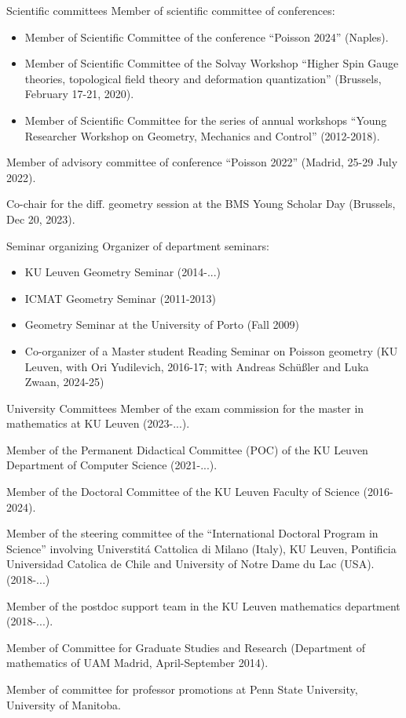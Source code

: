 \documentclass[12p]{resume}
\begin{document}
\begin{category}{Scientific committees}
\citemnobullet 
Member of scientific committee of conferences:
 \begin{itemize}
\item Member of Scientific Committee of the conference ``Poisson 2024'' (Naples).
\item  Member of Scientific Committee of the Solvay Workshop ``Higher Spin Gauge theories, topological field theory and deformation quantization'' (Brussels, February 17-21, 2020).
\item Member of Scientific Committee for the series of annual workshops ``Young Researcher Workshop on Geometry, Mechanics and Control'' (2012-2018).
 \end{itemize}
 Member of advisory committee of conference ``Poisson 2022'' (Madrid, 25-29 July 2022).
 
Co-chair for the diff. geometry session at the BMS Young Scholar Day (Brussels, Dec 20, 2023).
 \end{category}
 
\begin{category}{Seminar organizing}
\citemnobullet Organizer of department seminars:
\begin{itemize}
\item KU Leuven Geometry Seminar (2014-...)
\item ICMAT Geometry Seminar (2011-2013)
\item Geometry Seminar at the University of Porto (Fall 2009)
\item Co-organizer of a Master student Reading Seminar on Poisson geometry (KU Leuven, with Ori Yudilevich, 2016-17; with Andreas Sch\"u{\ss}ler and Luka Zwaan, 2024-25)
\end{itemize}
 \end{category}

\begin{category}{University Committees}
 \citemnobullet Member of the exam commission for the master in mathematics at KU Leuven (2023-...).

 \citemnobullet Member of the Permanent Didactical Committee (POC) of the KU Leuven Department of Computer Science (2021-...).

 \citemnobullet Member of the Doctoral Committee of the KU Leuven Faculty of Science (2016-2024).
 
  \citemnobullet Member of the steering committee of the ``International Doctoral Program in Science'' involving Universtit\'a Cattolica di Milano (Italy), KU Leuven,    Pontificia Universidad Catolica de Chile and University of Notre Dame du Lac (USA).
(2018-...) 

 
\citemnobullet Member of the postdoc support team in the KU Leuven mathematics department (2018-...).

\citemnobullet Member of Committee for Graduate Studies and Research (Department of mathematics of UAM Madrid, April-September 2014).

\citemnobullet Member of committee for professor promotions at 
Penn State University, 
University of Manitoba.
 \end{category}
\end{document}

